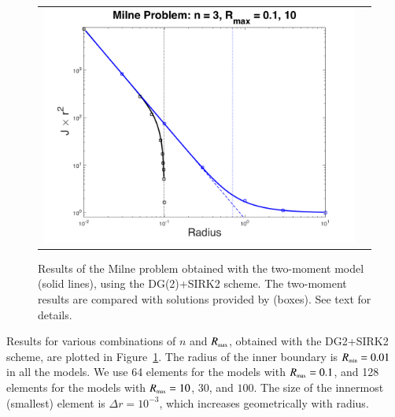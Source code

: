 \documentclass[11pt,letterpaper,twoside,english,final]{article}
\begin{document}
\begin{figure}[h]
\begin{tabular}{cc}
    \includegraphics[scale=0.4]{./Figures/MilneProblem1D_n30.png}
  \end{tabular}
  \vspace{-0.1in}
  \flushleft\caption[Results of the Milne problem obtained with the two-moment model (solid lines), using the DG(2)+SIRK2 scheme.]{Results of the Milne problem obtained with the two-moment model (solid lines), using the DG(2)+SIRK2 scheme.  \textmd{The two-moment results are compared with solutions provided by \citep{hummerRybicki_1971} (boxes).  See text for details.}}
  \label{fig:milneProblem1D}
\end{figure}

Results for various combinations of $n$ and $R_{\mbox{\tiny max}}$, obtained with the DG2+SIRK2 scheme, are plotted in Figure~\ref{fig:milneProblem1D}.  
The radius of the inner boundary is $R_{\mbox{\tiny min}}=0.01$ in all the models.  
We use 64 elements for the models with $R_{\mbox{\tiny max}}=0.1$, and 128 elements for the models with $R_{\mbox{\tiny max}}=10$, $30$, and $100$.  
The size of the innermost (smallest) element is $\Delta r=10^{-3}$, which increases geometrically with radius.  
\end{document}
